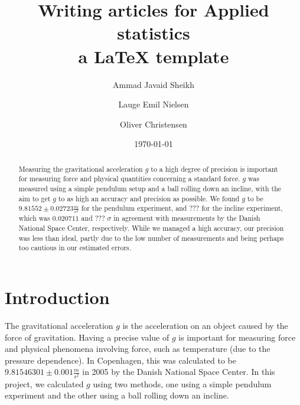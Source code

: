\documentclass[a4paper,%
                aps,%
                prl,%
                amsfonts,%
                amssymb,%
                amsmath,%
                nobibnotes,%
                twocolumn, %
                twoside,%
                balancelastpage,%
                eqsecnum] %
                {revtex4-1}
\begin{document}

\title{Writing articles for Applied statistics \\ a \LaTeX
  template} %
\date{\today} %

\author{Ammad Javaid Sheikh} \author{Lauge Emil Nielsen} \author{Oliver
  Christensen}  %

\begin{abstract}
  Measuring the gravitational acceleration $g$ to a high degree of precision is
  important for measuring force and physical quantities concerning a standard
  force. $g$ was measured using a simple pendulum setup and a ball rolling down
  an incline, with the aim to get $g$ to as high an accuracy and precision as
  possible. We found $g$ to be $9.81552 \pm 0.02723 \frac{m}{s^2}$ for the
  pendulum experiment, and ??? for the incline experiment, which was $0.020711$
  and ??? $\sigma$ in agreement with measurements by the Danish National Space
  Center, respectively. While we managed a high accuracy, our precision was less
  than ideal, partly due to the low number of measurements and being perhaps too
  cautious in our estimated errors.
\end{abstract}

\maketitle

\setcounter{section}{1} %
\setcounter{equation}{0} %


\section{Introduction}
The gravitational acceleration $g$ is the acceleration on an object caused by
the force of gravitation. Having a precise value of $g$ is important for
measuring force and physical phenomena involving force, such as temperature (due
to the pressure dependence). In Copenhagen, this was calculated to be
$9.81546301 \pm 0.001 \frac{m}{s^2}$ in 2005 by the Danish National Space
Center.\cite{Gravity2005} In this project, we calculated $g$ using two methods,
one using a simple pendulum experiment and the other using a ball rolling down
an incline.
\end{document}
